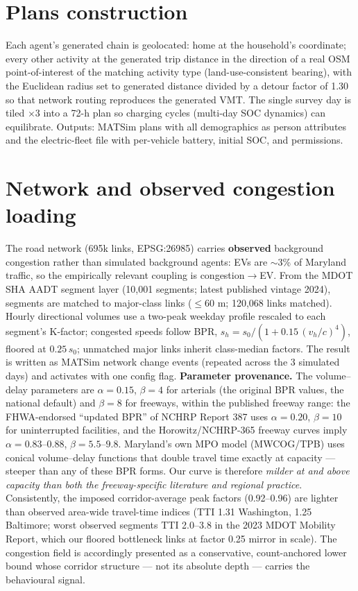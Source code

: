 \documentclass[11pt]{article}
\begin{document}
\section{Plans construction}
Each agent's generated chain is geolocated: home at the household's coordinate;
every other activity at the generated trip distance in the direction of a real
OSM point-of-interest of the matching activity type (land-use-consistent bearing),
with the Euclidean radius set to generated distance divided by a detour factor of
1.30 so that network routing reproduces the generated VMT. The single survey day
is tiled $\times$3 into a 72-h plan so charging cycles (multi-day SOC dynamics)
can equilibrate. Outputs: MATSim plans with all demographics as person attributes
and the electric-fleet file with per-vehicle battery, initial SOC, and permissions.

\section{Network and observed congestion loading}
\label{sec:net}
The road network (695k links, EPSG:26985) carries \textbf{observed} background
congestion rather than simulated background agents: EVs are $\sim$3\% of Maryland
traffic, so the empirically relevant coupling is congestion$\rightarrow$EV.
From the MDOT SHA AADT segment layer (10{,}001 segments; latest published vintage
2024), segments are matched to major-class links ($\le$60 m; 120{,}068 links
matched). Hourly directional volumes use a two-peak weekday profile rescaled to
each segment's K-factor; congested speeds follow BPR,
$s_h = s_0/(1+0.15\,(v_h/c)^4)$, floored at $0.25\,s_0$; unmatched major links
inherit class-median factors. The result is written as MATSim network change
events (repeated across the 3 simulated days) and activates with one config flag.
\textbf{Parameter provenance.} The volume--delay parameters are $\alpha=0.15$,
$\beta=4$ for arterials (the original BPR values, the national default) and
$\beta=8$ for freeways, within the published freeway range: the FHWA-endorsed
``updated BPR'' of NCHRP Report 387 uses $\alpha=0.20$, $\beta=10$ for
uninterrupted facilities, and the Horowitz/NCHRP-365 freeway curves imply
$\alpha=0.83$--$0.88$, $\beta=5.5$--$9.8$. Maryland's own MPO model (MWCOG/TPB)
uses conical volume--delay functions that double travel time exactly at capacity
--- steeper than any of these BPR forms. Our curve is therefore \emph{milder at
and above capacity than both the freeway-specific literature and regional
practice}. Consistently, the imposed corridor-average peak factors (0.92--0.96)
are lighter than observed area-wide travel-time indices (TTI 1.31 Washington,
1.25 Baltimore; worst observed segments TTI 2.0--3.8 in the 2023 MDOT Mobility
Report, which our floored bottleneck links at factor 0.25 mirror in scale). The
congestion field is accordingly presented as a conservative, count-anchored
lower bound whose corridor structure --- not its absolute depth --- carries the
behavioural signal.
\end{document}
